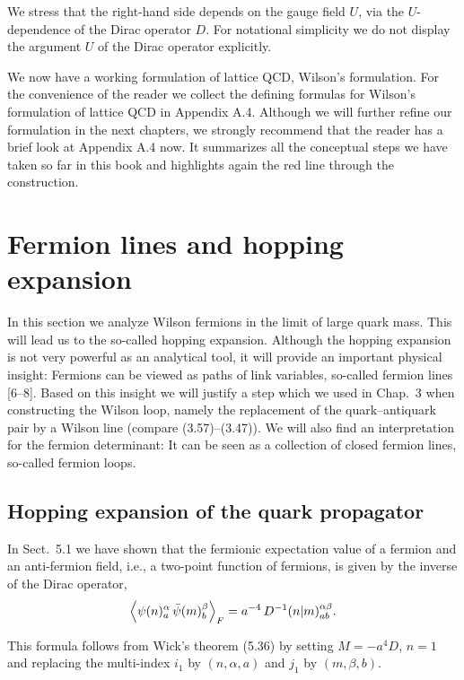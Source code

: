 We stress that the right-hand side depends on the gauge field $U$, via the
$U$-dependence of the Dirac operator $D$. For notational simplicity we do not
display the argument $U$ of the Dirac operator explicitly.

We now have a working formulation of lattice QCD, Wilson's formulation.
For the convenience of the reader we collect the defining formulas for Wilson's
formulation of lattice QCD in Appendix A.4. Although we will further refine
our formulation in the next chapters, we strongly recommend that the reader
has a brief look at Appendix A.4 now. It summarizes all the conceptual steps
we have taken so far in this book and highlights again the red line through
the construction.

\section{Fermion lines and hopping expansion}

In this section we analyze Wilson fermions in the limit of large quark mass.
This will lead us to the so-called hopping expansion. Although the hopping expansion is not very powerful as an analytical tool, it will provide an important
physical insight: Fermions can be viewed as paths of link variables, so-called
fermion lines [6--8]. Based on this insight we will justify a step which we used
in Chap.~3 when constructing the Wilson loop, namely the replacement of
the quark--antiquark pair by a Wilson line (compare (3.57)--(3.47)). We will
also find an interpretation for the fermion determinant: It can be seen as a
collection of closed fermion lines, so-called fermion loops.

\subsection{Hopping expansion of the quark propagator}

In Sect.~5.1 we have shown that the fermionic expectation value of a fermion
and an anti-fermion field, i.e., a two-point function of fermions, is given by
the inverse of the Dirac operator,
\begin{equation}
  \left\langle \psi(n)^{\alpha}_a\,\bar{\psi}(m)^{\beta}_b \right\rangle_F
  = a^{-4}\,D^{-1}(n|m)^{\alpha\beta}_{ab} .
\end{equation}

This formula follows from Wick's theorem (5.36) by setting $M = -a^4 D$, $n = 1$
and replacing the multi-index $i_1$ by $(n, \alpha, a)$ and $j_1$ by $(m, \beta, b)$.

